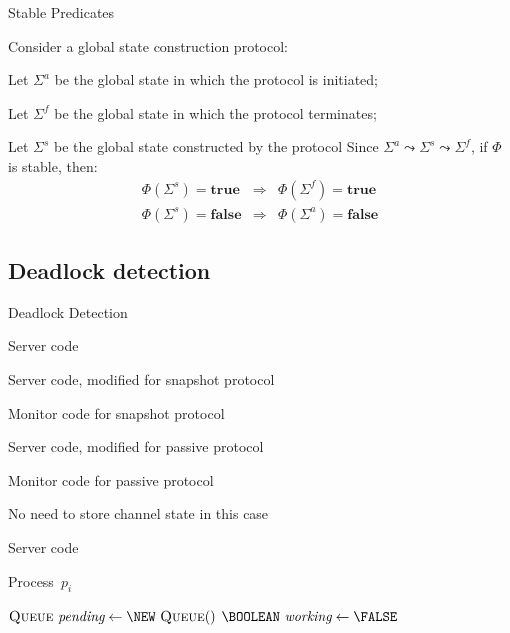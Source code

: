 \begin{frame}{Stable Predicates}

Consider a global state construction protocol:
\BI
\item Let $\Sigma^a$ be the global state in which the protocol is initiated;
\item Let $\Sigma^f$ be the global state in which the protocol terminates;
\item Let $\Sigma^s$ be the global state constructed by the protocol
\EI
Since $\Sigma^a \leadsto \Sigma^s \leadsto \Sigma^f$, if $\Phi$ is stable, then:
\begin{eqnarray*}
\Phi(\Sigma^s) = \mathbf{true} &\Rightarrow& \Phi(\Sigma^f) = \mathbf{true} \\
\Phi(\Sigma^s) = \mathbf{false} &\Rightarrow& \Phi(\Sigma^a) = \mathbf{false}
\end{eqnarray*}

\end{frame}

\subsection{Deadlock detection}

\begin{frame}{Deadlock Detection}

\BI 
\item Server code
\item Server code, modified for snapshot protocol
\item Monitor code for snapshot protocol
\item Server code, modified for passive protocol
\item Monitor code for passive protocol
\EI

\BI
\item No need to store channel state in this case
\EI

\end{frame}


\begin{frame}[shrink]{Server code}

\begin{Procedure}
\caption{Process\ $p_i$}
  $\Queue\ \Pending \gets \NEW\ \Queue()$\;
  $\BOOLEAN\ \Working \gets \FALSE$\;
\end{Procedure}

\end{frame}

